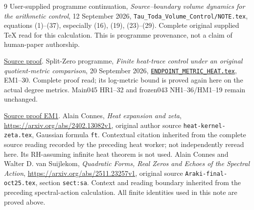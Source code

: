 \documentclass[11pt]{article}
\begin{document}
\begin{thebibliography}{9}
 User-supplied programme continuation,
\emph{Source--boundary volume dynamics for the arithmetic control},
12 September 2026, \texttt{Tau\_Toda\_Volume\_Control/NOTE.tex},
equations (1)--(37), especially (16), (19), (23)--(29).
Complete original supplied TeX read for this calculation. This is
programme provenance, not a claim of human-paper authorship.

\href{https://github.com/KokunoYumeto/zeta-function-research-reader/blob/5992ad50c0f2a06921f1fcaded7b4e38097c0739/workbenches/splitzero-tandem/continuations/20260920-original-kernel-mixed-determinants/providers/TODA_VOLUME_CONTROL.tex\#L1}{Source proof}.
 Split-Zero programme,
\emph{Finite heat-trace control under an original quotient-metric comparison},
20 September 2026, \href{https://github.com/KokunoYumeto/zeta-function-research-reader/blob/5992ad50c0f2a06921f1fcaded7b4e38097c0739/workbenches/splitzero-tandem/continuations/20260920-original-kernel-mixed-determinants/providers/ENDPOINT_METRIC_HEAT.tex\#L1}{\texttt{ENDPOINT\_METRIC\_HEAT.tex}}, EM1--30.
Complete proof read; its log-metric bound is proved again here on the
actual degree metrics. Main045 HR1--32 and frozen043 NH1--36/HM1--19
remain unchanged.

\href{https://github.com/KokunoYumeto/zeta-function-research-reader/blob/5992ad50c0f2a06921f1fcaded7b4e38097c0739/workbenches/splitzero-tandem/continuations/20260920-original-kernel-mixed-determinants/providers/ENDPOINT_METRIC_HEAT.tex\#L38}{Source proof EM1}.
 Alain Connes, \emph{Heat expansion and zeta},
\url{https://arxiv.org/abs/2402.13082v1}, original author source
\texttt{heat-kernel-zeta.tex}, Gaussian formula \texttt{ft}.
Contextual citation inherited from the complete source reading recorded
by the preceding heat worker; not independently reread here. Its
RH-assuming infinite heat theorem is not used.
 Alain Connes and Walter D. van Suijlekom,
\emph{Quadratic Forms, Real Zeros and Echoes of the Spectral Action},
\url{https://arxiv.org/abs/2511.23257v1}, original source
\texttt{Araki-final-oct25.tex}, section \texttt{sect:sa}.
Context and reading boundary inherited from the preceding spectral-action
calculation. All finite identities used in this note are proved above.
\end{thebibliography}
\end{document}
